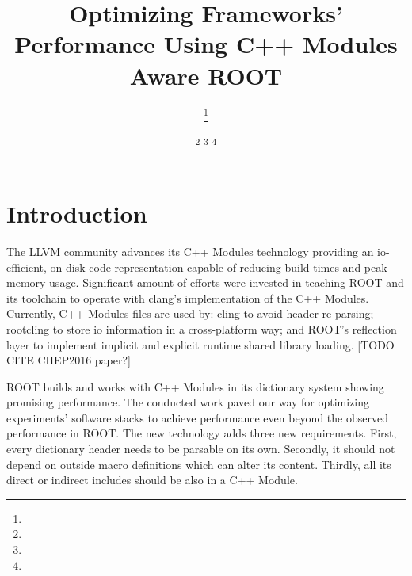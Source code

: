 \documentclass{webofc}
\begin{document}
\title{Optimizing Frameworks’ Performance Using C++ Modules Aware ROOT}

\author{
\fnsep\thanks{} \and
        \fnsep\thanks
        {}
        \fnsep\thanks{}
        \fnsep\thanks{}
}


%
\maketitle
%
\section{Introduction}
\label{intro}

The LLVM community advances its C++ Modules technology providing an io-efficient, on-disk code representation capable of reducing build times and peak memory usage. Significant amount of efforts were invested in teaching ROOT and its toolchain to operate with clang's implementation of the C++ Modules. Currently, C++ Modules files are used by: cling to avoid header re-parsing; rootcling to store io information in a cross-platform way; and ROOT's reflection layer to implement implicit and explicit runtime shared library loading. [TODO CITE CHEP2016 paper?]

ROOT builds and works with C++ Modules in its dictionary system showing promising performance. The conducted work paved our way for optimizing experiments' software stacks to achieve performance even beyond the observed performance in ROOT. The new technology adds three new requirements. First, every dictionary header needs to be parsable on its own. Secondly, it should not depend on outside macro definitions which can alter its content. Thirdly, all its direct or indirect includes should be also in a C++ Module.
\end{document}
